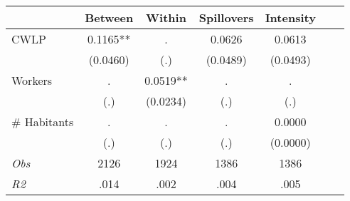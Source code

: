 \begin{tabular}{l*{6}{c}}\hline&\multicolumn{1}{c}{Between}&\multicolumn{1}{c}{Within}&\multicolumn{1}{c}{Spillovers}&\multicolumn{1}{c}{Intensity}\\ \hline 
CWLP & 0.1165** & . & 0.0626 & 0.0613 \\
 & (0.0460) & (.) & (0.0489) & (0.0493) \\
Workers & . & 0.0519** & . & . \\
 & (.) & (0.0234) & (.) & (.) \\
\# Habitants & . & . & . & 0.0000 \\
  & (.) & (.) & (.) & (0.0000) \\
\hline \textit{Obs} & 2126 & 1924 & 1386 & 1386  \\ \textit{R2} & .014 & .002 & .004 & .005 \\ \hline \end{tabular}
